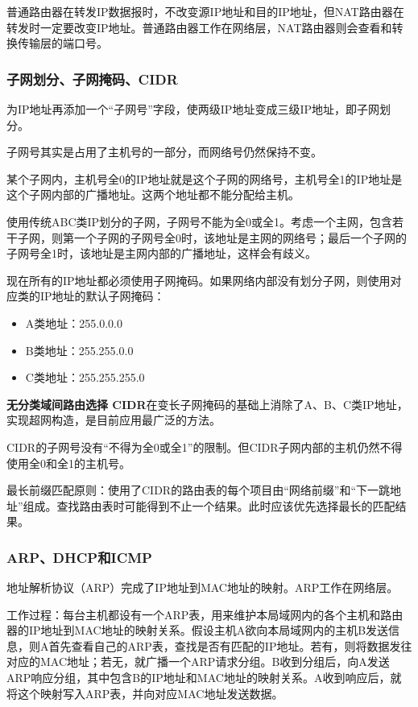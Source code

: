 \documentclass[12pt, a4paper, oneside]{ctexart}
\begin{document}
普通路由器在转发IP数据报时，不改变源IP地址和目的IP地址，但NAT路由器在转发时一定要改变IP地址。普通路由器工作在网络层，NAT路由器则会查看和转换传输层的端口号。

\subsubsection{子网划分、子网掩码、CIDR}

为IP地址再添加一个“子网号”字段，使两级IP地址变成三级IP地址，即子网划分。

子网号其实是占用了主机号的一部分，而网络号仍然保持不变。

某个子网内，主机号全0的IP地址就是这个子网的网络号，主机号全1的IP地址是这个子网内部的广播地址。这两个地址都不能分配给主机。

使用传统ABC类IP划分的子网，子网号不能为全0或全1。考虑一个主网，包含若干子网，则第一个子网的子网号全0时，该地址是主网的网络号；最后一个子网的子网号全1时，该地址是主网内部的广播地址，这样会有歧义。

现在所有的IP地址都必须使用子网掩码。如果网络内部没有划分子网，则使用对应类的IP地址的默认子网掩码：
\begin{itemize}
    \item A类地址：255.0.0.0
    \item B类地址：255.255.0.0
    \item C类地址：255.255.255.0
\end{itemize}

\textbf{无分类域间路由选择 CIDR}在变长子网掩码的基础上消除了A、B、C类IP地址，实现超网构造，是目前应用最广泛的方法。

CIDR的子网号没有“不得为全0或全1”的限制。但CIDR子网内部的主机仍然不得使用全0和全1的主机号。

最长前缀匹配原则：使用了CIDR的路由表的每个项目由“网络前缀”和“下一跳地址”组成。查找路由表时可能得到不止一个结果。此时应该优先选择最长的匹配结果。

\subsubsection{ARP、DHCP和ICMP}

地址解析协议（ARP）完成了IP地址到MAC地址的映射。ARP工作在网络层。

工作过程：每台主机都设有一个ARP表，用来维护本局域网内的各个主机和路由器的IP地址到MAC地址的映射关系。假设主机A欲向本局域网内的主机B发送信息，则A首先查看自己的ARP表，查找是否有匹配的IP地址。若有，则将数据发往对应的MAC地址；若无，就广播一个ARP请求分组。B收到分组后，向A发送ARP响应分组，其中包含B的IP地址和MAC地址的映射关系。A收到响应后，就将这个映射写入ARP表，并向对应MAC地址发送数据。
\end{document}
